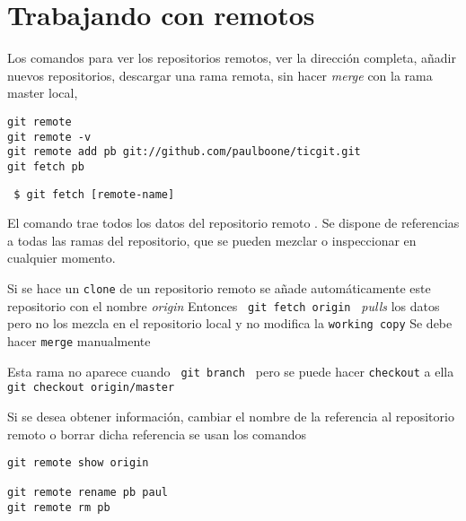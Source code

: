 \documentclass[]{article}
\begin{document}
\section{Trabajando con remotos}
Los comandos para ver los repositorios remotos, ver la dirección completa, añadir nuevos repositorios, descargar una rama remota, sin hacer \textit{merge} con la rama master local, 
\begin{verbatim}
git remote 
git remote -v
git remote add pb git://github.com/paulboone/ticgit.git
git fetch pb
\end{verbatim}

\verb= $ git fetch [remote-name] =

El comando trae todos los datos del repositorio remoto . Se dispone de referencias a todas las ramas del repositorio, que se pueden mezclar o inspeccionar en cualquier momento.

Si se hace un \texttt{clone} de un repositorio remoto se añade automáticamente este repositorio con el nombre \textit{origin} Entonces \verb= git fetch origin = \textit{pulls } los datos pero no los mezcla en el repositorio local y no modifica la \texttt{working copy} Se debe hacer \texttt{merge} manualmente

Esta rama no aparece cuando \verb= git branch = pero se puede hacer \texttt{checkout} a ella \verb= git checkout origin/master =

Si se desea obtener información, cambiar el nombre de la referencia al repositorio remoto o borrar dicha referencia se usan los comandos

\begin{verbatim}
git remote show origin

git remote rename pb paul
git remote rm pb

\end{verbatim}
\end{document}
